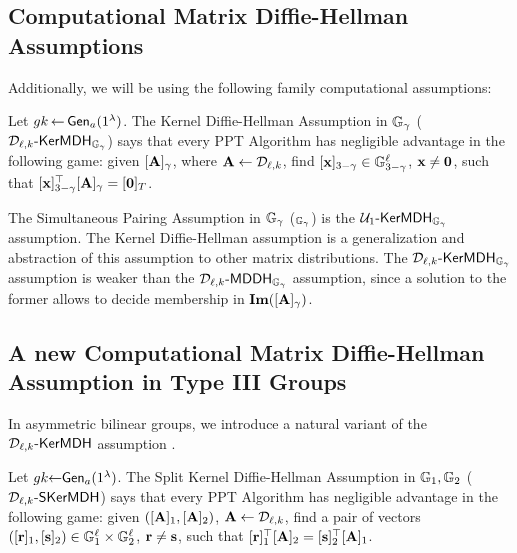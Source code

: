 \subsection{Computational Matrix Diffie-Hellman Assumptions}
Additionally, we will be using the following family  computational assumptions:
\begin{definition}Let  ${gk} 
\hspace*{-1pt}
\gets
\hspace*{-1pt}
\mathsf{Gen}_a(1^\lambda)$.
The Kernel Diffie-Hellman Assumption in $\mathbb{G}_\gamma$  ($\mathcal{D}_{\ell,k}\mbox{-}\mathsf{KerMDH}_{\mathbb{G}_\gamma}$) says that every PPT Algorithm has negligible advantage in the following  game: given $[\mathbf{{A}}]_\gamma$, where $\mathbf{{A}} \gets \mathcal{D}_{\ell,k}$, find $[\mathbf{x}]_{3-\gamma} \in \mathbb{G}_{3-\gamma}^{\ell}$, $\mathbf{x} \neq \mathbf{0}$, such that 
$[\mathbf{x}]_{3-\gamma}^{\top}[\mathbf{{A}}]_{\gamma}=[\mathbf{0}]_T$. 
\end{definition}
The  Simultaneous Pairing Assumption in $\mathbb{G}_\gamma$  (\SP$_{\mathbb{G}_{\gamma}}$) is the $ \mathcal{U}_1\mbox{-}\mathsf{KerMDH}_{\mathbb{G}_{\gamma}}$ assumption. The Kernel Diffie-Hellman assumption is a generalization and abstraction of this assumption to other matrix distributions. 
The $\mathcal{D}_{\ell,k}\mbox{-}\mathsf{KerMDH}_{\mathbb{G}_{\gamma}}$ assumption is weaker than the $\mathcal{D}_{\ell,k}\mbox{-}\mathsf{MDDH}_{\mathbb{G}_{\gamma}}$ assumption, since a solution to the former allows to decide membership in $\mathbf{Im}([\mathbf{{A}}]_{\gamma})$.

\subsection{A new Computational Matrix Diffie-Hellman Assumption in Type III Groups}

In asymmetric bilinear groups, we introduce a natural variant of the $\mathcal{D}_{\ell,k}\mbox{-}\mathsf{KerMDH}$ assumption \cite{AC:GonHevRaf15}.  
\begin{definition}
Let  ${gk} \hspace*{-3pt} \gets
\hspace*{-3pt}
\mathsf{Gen}_a(1^\lambda)$.
The Split Kernel Diffie-Hellman Assumption in $\mathbb{G}_1,\mathbb{G}_2$  ($\mathcal{D}_{\ell,k}\mbox{-}\mathsf{SKerMDH}$) says that every PPT Algorithm has negligible advantage in the following  game: given $([\mathbf{{A}}]_1,[\mathbf{{A}}]_2)$, $\mathbf{{A}} \leftarrow \mathcal{D}_{\ell,k}$, find a pair of vectors $([\mathbf{r}]_1,[\mathbf{s}]_2) \in \mathbb{G}_1^{\ell} \times \mathbb{G}_2^{\ell}$, $\mathbf{r} \neq \mathbf{s}$, such that 
$[\mathbf{r}]_1^{\top}[\mathbf{{A}}]_2=[\mathbf{s}]_2^{\top}[\mathbf{{A}}]_1$. 
\end{definition}


